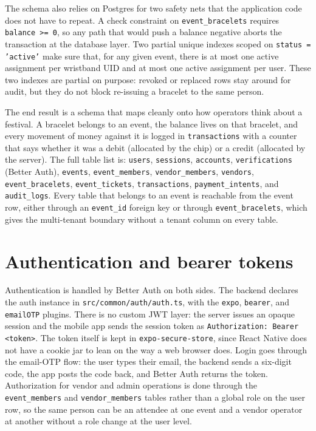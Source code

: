 The schema also relies on Postgres for two safety nets that the application code does not have to repeat. A check constraint on \texttt{event\_bracelets} requires \texttt{balance >= 0}, so any path that would push a balance negative aborts the transaction at the database layer. Two partial unique indexes scoped on \texttt{status = 'active'} make sure that, for any given event, there is at most one active assignment per wristband UID and at most one active assignment per user. These two indexes are partial on purpose: revoked or replaced rows stay around for audit, but they do not block re-issuing a bracelet to the same person.

The end result is a schema that maps cleanly onto how operators think about a festival. A bracelet belongs to an event, the balance lives on that bracelet, and every movement of money against it is logged in \texttt{transactions} with a counter that says whether it was a debit (allocated by the chip) or a credit (allocated by the server). The full table list is: \texttt{users}, \texttt{sessions}, \texttt{accounts}, \texttt{verifications} (Better Auth), \texttt{events}, \texttt{event\_members}, \texttt{vendor\_members}, \texttt{vendors}, \texttt{event\_bracelets}, \texttt{event\_tickets}, \texttt{transactions}, \texttt{payment\_intents}, and \texttt{audit\_logs}. Every table that belongs to an event is reachable from the event row, either through an \texttt{event\_id} foreign key or through \texttt{event\_bracelets}, which gives the multi-tenant boundary without a tenant column on every table.

\section{Authentication and bearer tokens}
\label{sec:impl-auth}

Authentication is handled by Better Auth on both sides. The backend declares the auth instance in \texttt{src/common/auth/auth.ts}, with the \texttt{expo}, \texttt{bearer}, and \texttt{emailOTP} plugins. There is no custom JWT layer: the server issues an opaque session and the mobile app sends the session token as \texttt{Authorization: Bearer <token>}. The token itself is kept in \texttt{expo-secure-store}, since React Native does not have a cookie jar to lean on the way a web browser does. Login goes through the email-OTP flow: the user types their email, the backend sends a six-digit code, the app posts the code back, and Better Auth returns the token. Authorization for vendor and admin operations is done through the \texttt{event\_members} and \texttt{vendor\_members} tables rather than a global role on the user row, so the same person can be an attendee at one event and a vendor operator at another without a role change at the user level.

